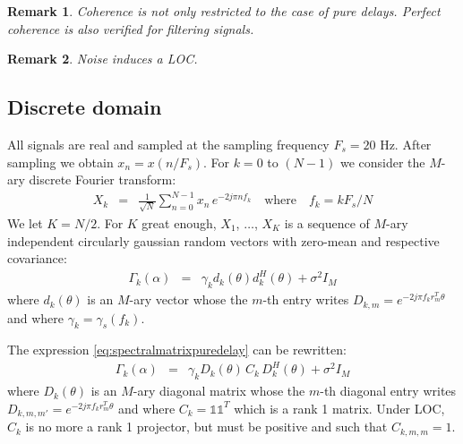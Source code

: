 \documentclass[a4paper, 12pt]{report}
\newcommand{\diag}[1]{\mathrm{diag}\left( #1 \right)}
\newtheorem{remark}{Remark}
\begin{document}
\begin{remark}
Coherence is not only restricted to the case of pure delays. Perfect coherence is also verified for filtering signals.
\end{remark}


\begin{remark}
Noise induces a LOC.
\end{remark}

\subsection{Discrete domain}

All signals are real and sampled at the sampling frequency  $F_{s}=20$ Hz. After sampling we obtain $x_{n}=x(n/F_{s})$. For $k=0$ to $(N-1)$ we consider the $M$-ary discrete Fourier transform:
 \begin{eqnarray*}
 X_{k}&=&\frac{1}{\sqrt{N}}\sum_{n=0}^{N-1}x_{n}\,e^{-2j\pi n f_{k}}
    \quad\mathrm{where}\quad
 f_{k}=kF_{s}/N
 \end{eqnarray*}
We let $K=N/2$.
For $K$ great enough, $X_{1}$, $\ldots$, $X_{K}$ is a sequence of  $M$-ary independent circularly gaussian random vectors with zero-mean and respective covariance:
\begin{eqnarray}
\label{eq:spectralmatrixpuredelay}
\Gamma_{k}(\alpha)&=&\gamma_{k}d_{k}(\theta)d_{k}^{H}(\theta)+\sigma^{2}I_{M}
\end{eqnarray}
where $d_{k}(\theta)$ is an $M$-ary vector whose the $m$-th entry writes $D_{k,m}=e^{-2j\pi f_{k} r_{m}^{T}\theta }$ and where $\gamma_{k}=\gamma_{s}(f_{k})$.

The expression \eqref{eq:spectralmatrixpuredelay} can be rewritten:
\begin{eqnarray}
\label{eq:spectralmatrixLOC}
\Gamma_{k}(\alpha)&=&\gamma_{k}D_{k}(\theta)\, C_{k}\,D_{k}^{H}(\theta)+\sigma^{2}I_{M}
\end{eqnarray}
where $D_{k}(\theta)$ is an $M$-ary diagonal matrix whose the $m$-th diagonal entry writes $D_{k,m,m'}=e^{-2j\pi f_{k} r_{m}^{T}\theta }$ and where $C_{k}=\mathds{1}\mathds{1}^{T}$ which is a rank 1 matrix. Under LOC, $C_{k}$ is no more a rank 1 projector,  but must be positive and such that $C_{k,m,m}=1$.
\end{document}
